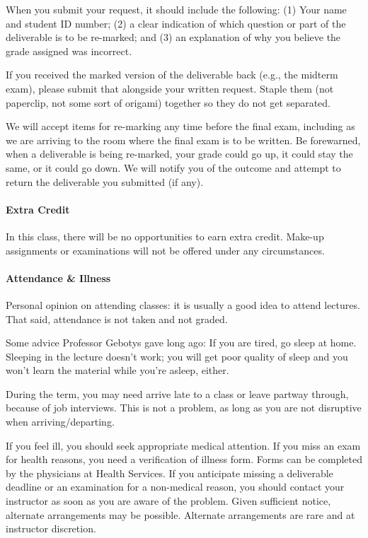 \documentclass[letterpaper,10pt]{article}
\begin{document}
When you submit your request, it should include the following: (1) Your name and student ID number; (2) a clear indication of which question or part of the deliverable is to be re-marked; and (3) an explanation of why you believe the grade assigned was incorrect.

If you received the marked version of the deliverable back (e.g., the midterm exam), please submit that alongside your written request. Staple them (not paperclip, not some sort of origami) together so they do not get separated.

We will accept items for re-marking any time before the final exam, including as we are arriving to the room where the final exam is to be written. Be forewarned, when a deliverable is being re-marked, your grade could go up, it could stay the same, or it could go down. We will notify you of the outcome and attempt to return the deliverable you submitted (if any).

\paragraph{Extra Credit}
In this class, there will be no opportunities to earn extra credit. Make-up assignments or examinations will not be offered under any circumstances.

\paragraph{Attendance \& Illness}

Personal opinion on attending classes: it is usually a good idea to attend lectures. That said, attendance is not taken and not graded.

Some advice Professor Gebotys gave long ago: If you are tired, go sleep at home. Sleeping in the lecture doesn't work; you will get poor quality of sleep and you won't learn the material while you're asleep, either.

During the term, you may need arrive late to a class or leave partway through, because of job interviews. This is not a problem, as long as you are not disruptive when arriving/departing.

If you feel ill, you should seek appropriate medical attention. If you miss an exam for health reasons, you need a verification of illness form. Forms can be completed by the physicians at Health Services. If you anticipate missing a deliverable deadline or an examination for a non-medical reason, you should contact your instructor as soon as you are aware of the problem. Given sufficient notice, alternate arrangements may be possible. Alternate arrangements are rare and at instructor discretion.
\end{document}
